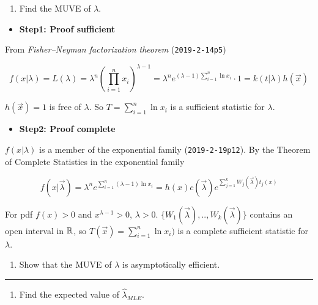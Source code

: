 \documentclass[12pt,]{article}
\providecommand{\tightlist}{%
  \setlength{\itemsep}{0pt}\setlength{\parskip}{0pt}}
\begin{document}
\begin{enumerate}
\def\labelenumi{\arabic{enumi}.}
\setcounter{enumi}{4}
\tightlist
\item
  Find the MUVE of \(\lambda\).
\end{enumerate}

\begin{itemize}
\tightlist
\item
  \textbf{Step1: Proof sufficient}
\end{itemize}

From \emph{Fisher--Neyman factorization theorem} (\texttt{2019-2-14p5})

\[f(x|\lambda)=L(\lambda)=\lambda^n(\prod_{i=1}^n x_i)^{\lambda-1}=\lambda^ne^{(\lambda-1)\sum^n_{i=1} \ln x_i}\cdot1=k(t|\lambda)h(\vec x)\]

\(h(\vec x)=1\) is free of \(\lambda\). So \(T=\sum^n_{i=1} \ln x_i\) is
a sufficient statistic for \(\lambda\).

\begin{itemize}
\tightlist
\item
  \textbf{Step2: Proof complete}
\end{itemize}

\(f(x|\lambda)\) is a member of the exponential family
(\texttt{2019-2-19p12}). By the Theorem of Complete Statistics in the
exponential family

\[f(x|\vec\lambda)=\lambda^ne^{\sum^n_{i=1} (\lambda-1)\ln x_i}=h(x)c(\vec \lambda)e^{\sum^k_{j=1}W_j(\vec \lambda)t_j(x)}\]

For pdf \(f(x)>0\) and \(x^{\lambda-1}>0\), \(\lambda>0\).
\(\{W_1(\vec \lambda),..,W_k(\vec \lambda)\}\) contains an open interval
in \(\Bbb R\), so \(T(\vec x)=\sum^n_{i=1} \ln x_i)\) is a complete
sufficient statistic for \(\lambda\).

\begin{enumerate}
\def\labelenumi{\arabic{enumi}.}
\setcounter{enumi}{5}
\tightlist
\item
  Show that the MUVE of \(\lambda\) is asymptotically efficient.
\end{enumerate}

\begin{center}\rule{0.5\linewidth}{\linethickness}\end{center}

\begin{enumerate}
\def\labelenumi{\alph{enumi}.}
\setcounter{enumi}{1}
\tightlist
\item
  Find the expected value of \(\hat\lambda_{MLE}\).
\end{enumerate}
\end{document}

